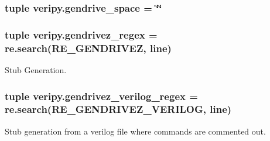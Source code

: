 \hypertarget{namespaceveripy_af6d3a3b592e0e9621179105b392ab262}{
\subsubsection[{gendrive\-\_\-space}]{\setlength{\rightskip}{0pt plus 5cm}tuple veripy.\-gendrive\-\_\-space = \char`\"{}\char`\"{}}}\label{namespaceveripy_af6d3a3b592e0e9621179105b392ab262}
\hypertarget{namespaceveripy_a188398590a71f5e7c68337fd92a67bf7}{
\subsubsection[{gendrivez\-\_\-regex}]{\setlength{\rightskip}{0pt plus 5cm}tuple veripy.\-gendrivez\-\_\-regex = re.\-search(R\-E\-\_\-\-G\-E\-N\-D\-R\-I\-V\-E\-Z, {\bf line})}}\label{namespaceveripy_a188398590a71f5e7c68337fd92a67bf7}


Stub Generation. 

\hypertarget{namespaceveripy_a502cf9f0ccd059abedb0a0e98d783d56}{
\subsubsection[{gendrivez\-\_\-verilog\-\_\-regex}]{\setlength{\rightskip}{0pt plus 5cm}tuple veripy.\-gendrivez\-\_\-verilog\-\_\-regex = re.\-search(R\-E\-\_\-\-G\-E\-N\-D\-R\-I\-V\-E\-Z\-\_\-\-V\-E\-R\-I\-L\-O\-G, {\bf line})}}\label{namespaceveripy_a502cf9f0ccd059abedb0a0e98d783d56}


Stub generation from a verilog file where commands are commented out. 

